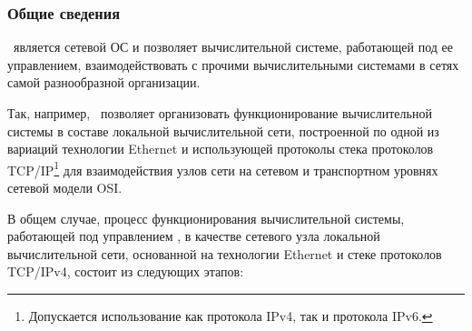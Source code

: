 
\subsubsection{Общие сведения}

	\linux\ является сетевой ОС и позволяет вычислительной системе, работающей под ее управлением,
	взаимодействовать с прочими вычислительными системами в сетях самой разнообразной организации.

	Так, например, \linux\ позволяет организовать функционирование вычислительной системы в составе локальной вычислительной
	сети, построенной по одной из вариаций технологии Ethernet и использующей протоколы стека протоколов
	TCP/IP\footnote{Допускается использование как протокола IPv4, так и протокола IPv6.}
	для взаимодействия узлов сети на сетевом и транспортном уровнях сетевой модели OSI.

	В общем случае, процесс функционирования вычислительной системы, работающей под управлением \linux,
	в качестве сетевого узла локальной вычислительной сети, основанной на технологии Ethernet и стеке протоколов
	TCP/IPv4, состоит из следующих этапов:

